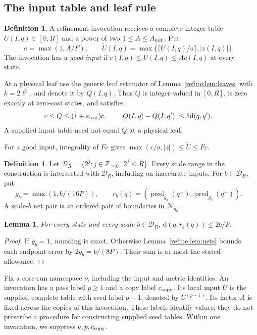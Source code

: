 \documentclass[11pt]{article}
\newtheorem{lemma}[theorem]{Lemma}
\theoremstyle{definition}
\newtheorem{definition}[theorem]{Definition}
\newcommand{\dd}{\mathrm d}
\newcommand{\1}{\mathbf 1}
\begin{document}
\subsection{The input table and leaf rule}

\begin{definition}\label{refine:def:input}
A refinement invocation receives a complete integer table
$U(I,q)\in[0,R]$ and a power of two $1\le A\le A_{\rm init}$.
Put
\[
 a=\max(1,A/F),\qquad
 \widetilde U(I,q)=\max\{\lceil U(I,q)/a\rceil,|z(I,q)|\}.
\]
The invocation has a \emph{good input} if
$c(I,q)\le U(I,q)\le Ac(I,q)$ at every state.

At a physical leaf use the generic leaf estimator of
Lemma~\ref{refine:lem:leaves} with $k=2\ell^3$, and denote it by $Q(I,q)$.
Thus $Q$ is integer-valued in $[0,R]$, is zero exactly at zero-cost states,
and satisfies
\[
 c\le Q\le(1+\varepsilon_{\rm leaf})c,
 \qquad |Q(I,q)-Q(I,q')|\le3\dd(q,q').
\]
A supplied input table need not equal $Q$ at a physical leaf.
\end{definition}

For a good input, integrality of $Fc$ gives
$\max(c/a,|z|)\le\widetilde U\le Fc$.

\begin{definition}\label{refine:def:rounding}
Let $\mathcal D_R=\{2^j:j\in\mathbb Z_{\ge0},\ 2^j\le R\}$.
Every scale range in the construction is intersected with $\mathcal D_R$,
including on inaccurate inputs. For $b\in\mathcal D_R$, put
\[
 g_b=\max(1,b/(16P)),\qquad
 r_b(q)=(\operatorname{pred}_{g_b}(q^-),
         \operatorname{pred}_{g_b}(q^+)).
\]
A scale-$b$ net pair is an ordered pair of boundaries in
$\mathcal N_{g_b}$.
\end{definition}

\begin{lemma}\label{refine:lem:rounding}
For every state and every scale $b\in\mathcal D_R$,
$\dd(q,r_b(q))\le2b/P$.
\end{lemma}
\begin{proof}
If $g_b=1$, rounding is exact. Otherwise
Lemma~\ref{refine:lem:nets} bounds each endpoint error by
$2g_b=b/(8P)$. Their sum is at most the stated allowance.
\end{proof}

Fix a core-run namespace $\nu$, including the input and metric identities.
An invocation has a pass label $p\ge1$ and a copy label $c_{\rm copy}$.
Its local input $U$ is the supplied complete table with seed label $p-1$,
denoted by $U^{(p-1)}$. Its factor $A$ is fixed across the copies of this
invocation. These labels identify values; they do not prescribe a
procedure for constructing supplied seed tables. Within one invocation,
we suppress $\nu,p,c_{\rm copy}$.
\end{document}
